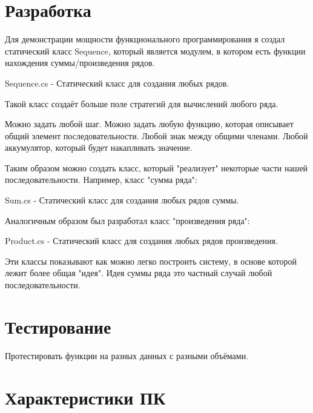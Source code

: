 \newpage
\section{Разработка}

Для демонстрации мощности функционального программирования я создал статический класс Sequence, который является модулем, в котором есть функции нахождения суммы/произведения рядов. 

\begin{code}
	
	\caption{Sequence.cs - Статический класс для создания любых рядов.}
\end{code}

Такой класс создаёт больше поле стратегий для вычислений любого ряда.

Можно задать любой шаг. Можно задать любую функцию, которая описывает общий элемент последовательности. Любой знак между общими членами. Любой аккумулятор, который будет накапливать значение.

Таким образом можно создать класс, который "реализует" некоторые части нашей последовательности. Например, класс "сумма ряда":

\begin{code}
	
	\caption{Sum.cs - Статический класс для создания любых рядов суммы.}
\end{code}

Аналогичным образом был разработал класс "произведения ряда":

\begin{code}
	
	\caption{Product.cs - Статический класс для создания любых рядов произведения.}
\end{code}

Эти классы показывают как можно легко построить систему, в основе которой лежит более общая "идея".
Идея суммы ряда это частный случай любой последовательности.

\newpage
\section{Тестирование}

Протестировать функции на разных данных с разными объёмами.

\newpage
\section{Характеристики ПК}

